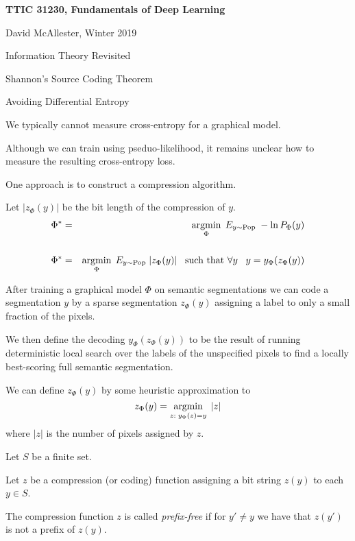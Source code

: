 





{\Huge

  \centerline{\bf TTIC 31230, Fundamentals of Deep Learning}
  \bigskip
  \centerline{David McAllester, Winter 2019}
  \vfill
  \centerline{Information Theory Revisited}
  \vfill
  \centerline{Shannon's Source Coding Theorem}
  \vfill
  \centerline{Avoiding Differential Entropy}


We typically cannot measure cross-entropy for a graphical model.

\vfill
Although we can train using pseduo-likelihood, it remains unclear how to measure the resulting cross-entropy loss.

\vfill
One approach is to construct a compression algorithm.

\vfill
Let $|z_\Phi(y)|$ be the bit length of the compression of $y$.
{\color{red}
\begin{eqnarray*}
\Phi^* & = & \operatorname*{argmin}_\Phi \;E_{y \sim \mathrm{Pop}} \;-\ln P_\Phi(y) \\
\\
\Phi^* & = & \operatorname*{argmin}_\Phi \;E_{y \sim \mathrm{Pop}} \;|z_\Phi(y)|\;\;\;\mbox{such that $\forall y\;\;\;y = y_\Phi(z_\Phi(y))$}
\end{eqnarray*}
}


After training a graphical model $\Phi$ on semantic segmentations we can code a segmentation $y$
by a sparse segmentation $z_\Phi(y)$ assigning a label to only a small fraction of the pixels.

\vfill
We then define the decoding $y_\Phi(z_\Phi(y))$ to be the result of running deterministic local search over
the labels of the unspecified pixels to find a locally best-scoring full semantic segmentation.

\vfill
We can define $z_\Phi(y)$ by some heuristic approximation to
$$z_\Phi(y) = \operatorname*{argmin}_{z:\; y_\Phi(z) = y}\;|z|$$
where $|z|$ is the number of pixels assigned by $z$.


Let $S$ be a finite set.

\vfill
Let $z$ be a compression (or coding) function  assigning a bit string $z(y)$ to each $y \in S$.

\vfill
The compression function $z$ is called {\em prefix-free} if for $y' \not = y$ we have that $z(y')$ is not a prefix of $z(y)$.

}
